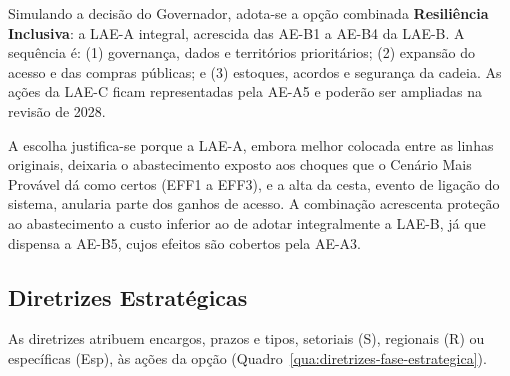 \documentclass[
	12pt,				%
	openright,			%
	oneside,			%
	a4paper,			%
	chapter=TITLE,		%
	section=TITLE,		%
	english,			%
	french,				%
	spanish,			%
	brazil,				%
 ]{abntex2}
\begin{document}
Simulando a decisão do Governador, adota-se a opção combinada
\textbf{Resiliência Inclusiva}: a LAE-A integral, acrescida das AE-B1 a AE-B4 da
LAE-B. A sequência é: (1) governança, dados e territórios prioritários; (2)
expansão do acesso e das compras públicas; e (3) estoques, acordos e segurança
da cadeia. As ações da LAE-C ficam representadas pela AE-A5 e poderão ser
ampliadas na revisão de 2028.

A escolha justifica-se porque a LAE-A, embora melhor colocada entre as linhas
originais, deixaria o abastecimento exposto aos choques que o Cenário Mais
Provável dá como certos (EFF1 a EFF3), e a alta da cesta, evento de ligação do
sistema, anularia parte dos ganhos de acesso. A combinação acrescenta proteção ao
abastecimento a custo inferior ao de adotar integralmente a LAE-B, já que
dispensa a AE-B5, cujos efeitos são cobertos pela AE-A3.

\subsection{Diretrizes Estratégicas}
As diretrizes atribuem encargos, prazos e tipos, setoriais (S), regionais (R)
ou específicas (Esp), às ações da opção
(Quadro~\ref{qua:diretrizes-fase-estrategica}).
\end{document}
